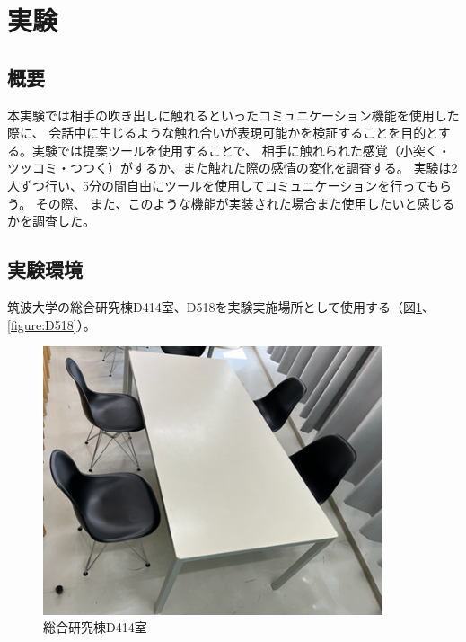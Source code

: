 \documentclass[11pt,a4paper]{ltjsreport}
\begin{document}
\section{実験}

\subsection{概要}
本実験では相手の吹き出しに触れるといったコミュニケーション機能を使用した際に、
会話中に生じるような触れ合いが表現可能かを検証することを目的とする。実験では提案ツールを使用することで、
相手に触れられた感覚（小突く・ツッコミ・つつく）がするか、また触れた際の感情の変化を調査する。
実験は2人ずつ行い、5分の間自由にツールを使用してコミュニケーションを行ってもらう。
その際、
また、このような機能が実装された場合また使用したいと感じるかを調査した。

\subsection{実験環境}
筑波大学の総合研究棟D414室、D518を実験実施場所として使用する（図\ref{figure:D414}、\ref{figure:D518}）。

\begin{figure}[htbp]
    \begin{center}
        \includegraphics[width=100mm]{PDF/D414.png}
        \caption{総合研究棟D414室}
        \label{figure:D414}
    \end{center}
\end{figure}
\end{document}
